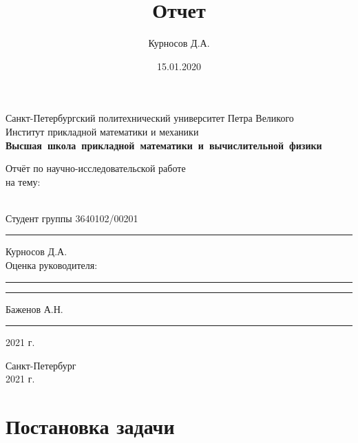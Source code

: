 \documentclass{article}
\title{Отчет}
\author{Курносов Д.А. }
\date{15.01.2020}
\begin{document}
\begin{titlepage}
        {\centering
            Санкт-Петербургский политехнический университет Петра Великого\\
            Институт прикладной математики и механики\\
            \textbf{Высшая~школа~прикладной~математики~и~вычислительной~физики}\\
        }
        
        \vfill
        
        {\centering
         \Large
            Отчёт по научно-исследовательской работе\\
            на тему:\\
            \textsl{}\\
        }
        
        \vfill
        
        Студент группы 3640102/00201 \hspace{0.225cm} \rule{4.6cm}{0.4pt} \hspace{0.225cm} Курносов Д.А.\\
        
        Оценка руководителя: \hspace{0.225cm} \rule{3cm}{0.4pt} \hspace{0.225cm} \rule{3cm}{0.4pt} \hspace{0.225cm} Баженов А.Н.\\
        
        {\raggedleft
            \textquote{\rule{1cm}{0.4pt}} \rule{3cm}{0.4pt} 2021 г.\\
        }
        
        \vfill
        
        {\centering
            Санкт-Петербург\\
            2021 г.\\
        }
    \end{titlepage}
\newpage

\tableofcontents
\newpage


\section{Постановка задачи}
\end{document}
